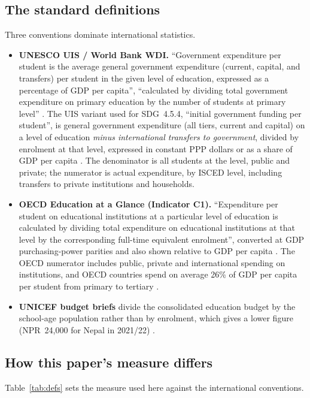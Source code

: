 \documentclass[11pt,a4paper]{article}
\begin{document}
\subsection{The standard definitions}
Three conventions dominate international statistics.
\begin{itemize}[leftmargin=1.4em]
\item \textbf{UNESCO UIS / World Bank WDI.} ``Government expenditure per student is the average general government expenditure (current, capital, and transfers) per student in the given level of education, expressed as a percentage of GDP per capita'', ``calculated by dividing total government expenditure on primary education by the number of students at primary level'' \cite{wb_meta_prim}. The UIS variant used for SDG~4.5.4, ``initial government funding per student'', is general government expenditure (all tiers, current and capital) on a level of education \emph{minus international transfers to government}, divided by enrolment at that level, expressed in constant PPP dollars or as a share of GDP per capita \cite{uis_meta}. The denominator is all students at the level, public and private; the numerator is actual expenditure, by ISCED level, including transfers to private institutions and households.
\item \textbf{OECD Education at a Glance (Indicator C1).} ``Expenditure per student on educational institutions at a particular level of education is calculated by dividing total expenditure on educational institutions at that level by the corresponding full-time equivalent enrolment'', converted at GDP purchasing-power parities and also shown relative to GDP per capita \cite{oecd2023}. The OECD numerator includes public, private and international spending on institutions, and OECD countries spend on average 26\% of GDP per capita per student from primary to tertiary \cite{oecd2022}.
\item \textbf{UNICEF budget briefs} divide the consolidated education budget by the school-age population rather than by enrolment, which gives a lower figure (NPR~24,000 for Nepal in 2021/22) \cite{unicef2022}.
\end{itemize}

\subsection{How this paper's measure differs}
Table~\ref{tab:defs} sets the measure used here against the international conventions.
\end{document}
